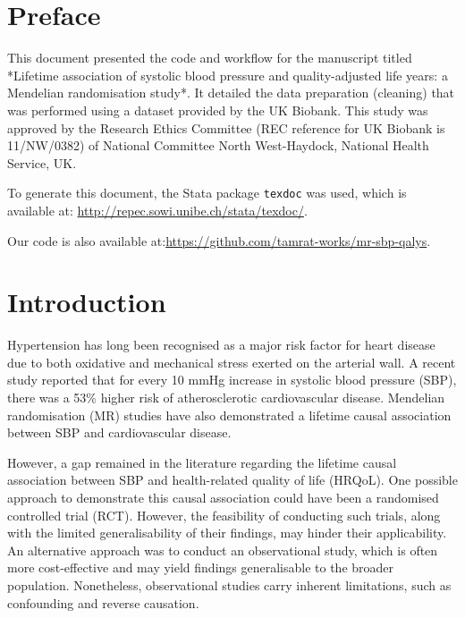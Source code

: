 \documentclass[11pt]{article}
\begin{document}
\section{Preface}
This document presented the code and workflow for the manuscript titled *Lifetime association of systolic blood pressure and quality-adjusted life years: a Mendelian randomisation study*. It detailed the data preparation (cleaning) that was performed using a dataset provided by the UK Biobank. This study was approved by the Research Ethics Committee (REC reference for UK Biobank is 11/NW/0382) of National Committee North West-Haydock, National Health Service, UK.

To generate this document, the Stata package \texttt{texdoc} was used, which is available at: \color{blue} \url{http://repec.sowi.unibe.ch/stata/texdoc/}.
\color{black}

Our code is also available at:\color{blue}\url{https://github.com/tamrat-works/mr-sbp-qalys}. 
\color{black} 

\color{black}  
\newpage
\section{Introduction}


Hypertension has long been recognised as a major risk factor for heart disease due to both oxidative and mechanical stress exerted on the arterial wall\cite{brown2020risk}. A recent study reported that for every 10 mmHg increase in systolic blood pressure (SBP), there was a 53\% higher risk of atherosclerotic cardiovascular disease\cite{whelton2020association}. Mendelian randomisation (MR) studies have also demonstrated a lifetime causal association between SBP and cardiovascular disease\cite{ference2019association, wan2021blood}.

However, a gap remained in the literature regarding the lifetime causal association between SBP and health-related quality of life (HRQoL). One possible approach to demonstrate this causal association could have been a randomised controlled trial (RCT). However, the feasibility of conducting such trials, along with the limited generalisability of their findings, may hinder their applicability. An alternative approach was to conduct an observational study, which is often more cost-effective and may yield findings generalisable to the broader population. Nonetheless, observational studies carry inherent limitations, such as confounding and reverse causation\cite{lawlor2008mendelian}.
\end{document}
